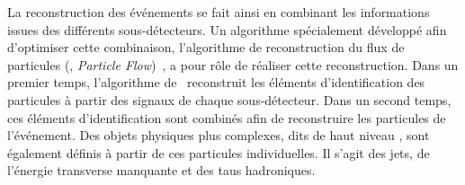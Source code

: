 \par La reconstruction des événements se fait ainsi en combinant les informations issues des différents sous-détecteurs.
Un algorithme spécialement développé afin d'optimiser cette combinaison, l'algorithme de reconstruction du flux de particules (\PF, \emph{Particle Flow})~\cite{particle-flow,Dordevic_particle_flow}, a pour rôle de réaliser cette reconstruction.
Dans un premier temps, l'algorithme de \PF\ reconstruit les éléments d'identification des particules à partir des signaux de chaque sous-détecteur.
Dans un second temps, ces éléments d'identification sont combinés afin de reconstruire les particules de l'événement.
Des objets physiques plus complexes, dits de \og haut niveau \fg, sont également définis à partir de ces particules individuelles.
Il s'agit des jets, de l'énergie transverse manquante et des taus hadroniques.





